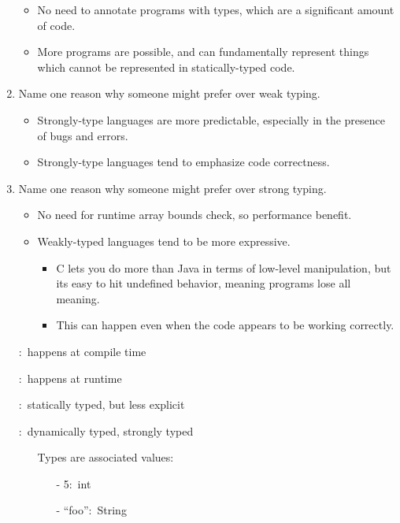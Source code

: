 \documentclass[12pt,a4paper]{article}
\begin{document}
\begin{enumerate}
\begin{itemize}
      \item No need to annotate programs with types, which are a significant amount of code.
      \item More programs are possible, and can fundamentally represent things which cannot be represented in statically-typed code.
    \end{itemize}
    \item Name one reason why someone might prefer  over weak typing. %
    \begin{itemize}
      \item Strongly-type languages are more predictable, especially in the presence of bugs and errors.
      \item Strongly-type languages tend to emphasize code correctness.
    \end{itemize}
    \item Name one reason why someone might prefer  over strong typing. %
    \begin{itemize}
      \item No need for runtime array bounds check, so performance benefit.
      \item Weakly-typed languages tend to be more expressive. 
      \begin{itemize}
        \item C lets you do more than Java in terms of low-level manipulation, but its easy to hit undefined behavior, meaning programs lose all meaning.
        \item This can happen even when the code appears to be working correctly.
      \end{itemize}
    \end{itemize}
    \clearpage
    \item[] :\ happens at compile time
    \item[] :\ happens at runtime
    \item[] :\ statically typed, but less explicit
    \item[] :\ dynamically typed, strongly typed
    \begin{itemize}
      \item[] Types are associated values:\
      \begin{itemize}
        \item[-] 5:\ int
        \item[-] ``foo'':\ String
      \end{itemize}
    \end{itemize} 

\end{enumerate}
\end{document}
